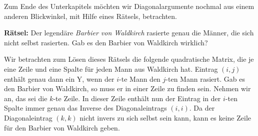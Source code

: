 Zum Ende des Unterkapitels möchten wir Diagonalargumente nochmal aus einem anderen Blickwinkel, mit Hilfe eines Rätsels, betrachten.

\textbf{Rätsel:}
Der legendäre \emph{Barbier von Waldkirch} rasierte genau die Männer, die sich nicht selbst rasierten.
Gab es den Barbier von Waldkirch wirklich?

Wir betrachten zum Lösen dieses Rätsels die folgende quadratische Matrix, die je eine Zeile und eine Spalte für jeden Mann aus Waldkirch hat.
Eintrag $(i,j)$ enthält genau dann ein Y, wenn der $i$-te Mann den $j$-ten Mann rasiert.
Gab es den Barbier von Waldkirch, so muss er in einer Zeile zu finden sein.
Nehmen wir an, das sei die $k$-te Zeile.
In dieser Zeile enthält nun der Eintrag in der $i$-ten Spalte immer genau das Inverse des Diagonaleintrags $(i,i)$.
Da der Diagonaleintrag $(k,k)$ nicht invers zu sich selbst sein kann, kann es keine Zeile für den Barbier von Waldkirch geben.

